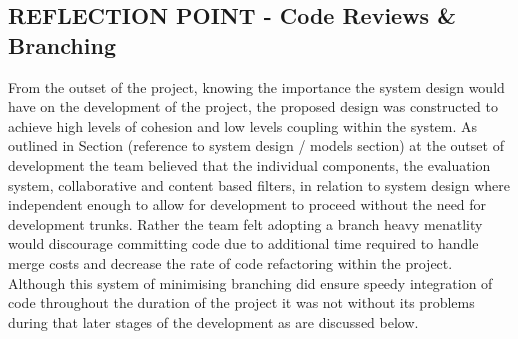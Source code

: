 \documentclass{l3proj}
\begin{document}
\subsection{REFLECTION POINT - Code Reviews \& Branching}
\label{sec:codereviewbranch}



From the outset of the project, knowing the importance the system design would have on the development of the project, the proposed design was constructed to achieve high levels of cohesion and low levels coupling within the system. As outlined in Section (reference to system design / models section) at the outset of development the team believed that the individual components, the evaluation system, collaborative and content based filters, in relation to system design where independent enough to allow for development to proceed without the need for development trunks. Rather the team felt adopting a branch heavy menatlity would discourage committing code due to additional time required to handle merge costs and decrease the rate of code refactoring within the project. Although this system of minimising branching did ensure speedy integration of code throughout the duration of the project it was not without its problems during that later stages of the development as are discussed below.
\end{document}
